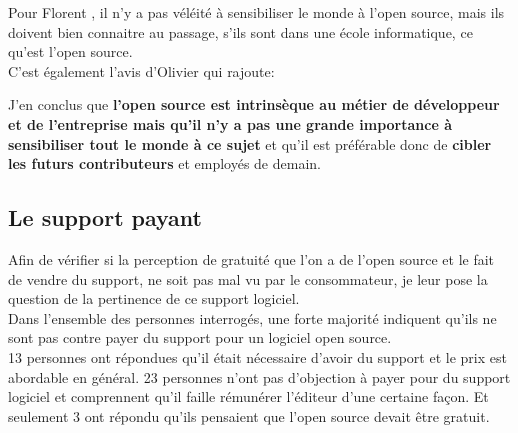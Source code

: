 				Pour Florent , il n'y a pas véléité à sensibiliser le monde à l'open source, mais ils doivent bien connaitre au passage, s'ils sont dans une école informatique, ce qu'est l'open source.\\

				C'est également l'avis d'Olivier  qui rajoute:

				\begin{center}
					\textit{
					}
				\end{center}

				J'en conclus que \textbf{l'open source est intrinsèque au métier de développeur et de l'entreprise mais qu'il n'y a pas une grande importance à sensibiliser tout le monde à ce sujet} et qu'il est préférable donc de \textbf{cibler les futurs contributeurs} et employés de demain.\\

				\newpage

		\subsection{Le support payant}

			Afin de vérifier si la perception de gratuité que l'on a de l'open source et le fait de vendre du support, ne soit pas mal vu par le consommateur, je leur pose la question de la pertinence de ce support logiciel.\\

			Dans l'ensemble des personnes interrogés, une forte majorité indiquent qu'ils ne sont pas contre payer du support pour un logiciel open source. \\

			13 personnes ont répondues qu'il était nécessaire d'avoir du support et le prix est abordable en général. 23 personnes n'ont pas d'objection à payer pour du support logiciel et comprennent qu'il faille rémunérer l'éditeur d'une certaine façon. Et seulement 3 ont répondu qu'ils pensaient que l'open source devait être gratuit.

